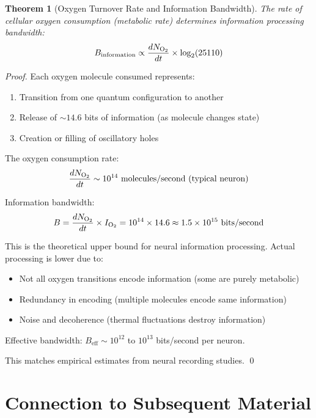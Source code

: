 \documentclass[12pt,a4paper]{article}
\newtheorem{theorem}{Theorem}
\begin{document}
\begin{theorem}[Oxygen Turnover Rate and Information Bandwidth]
\label{thm:oxygen_turnover}
The rate of cellular oxygen consumption (metabolic rate) determines information processing bandwidth:
\begin{equation}
B_{\text{information}} \propto \frac{dN_{\ce{O2}}}{dt} \times \log_2(25110)
\end{equation}
\end{theorem}

\begin{proof}
Each oxygen molecule consumed represents:
\begin{enumerate}
\item Transition from one quantum configuration to another
\item Release of $\sim 14.6$ bits of information (as molecule changes state)
\item Creation or filling of oscillatory holes
\end{enumerate}

The oxygen consumption rate:
\begin{equation}
\frac{dN_{\ce{O2}}}{dt} \sim 10^{14} \text{ molecules/second (typical neuron)}
\end{equation}

Information bandwidth:
\begin{equation}
B = \frac{dN_{\ce{O2}}}{dt} \times I_{\ce{O2}} = 10^{14} \times 14.6 \approx 1.5 \times 10^{15} \text{ bits/second}
\end{equation}

This is the theoretical upper bound for neural information processing. Actual processing is lower due to:
\begin{itemize}
\item Not all oxygen transitions encode information (some are purely metabolic)
\item Redundancy in encoding (multiple molecules encode same information)
\item Noise and decoherence (thermal fluctuations destroy information)
\end{itemize}

Effective bandwidth: $B_{\text{eff}} \sim 10^{12}$ to $10^{13}$ bits/second per neuron.

This matches empirical estimates from neural recording studies. \qed
\end{proof}

\section{Connection to Subsequent Material}
\end{document}
